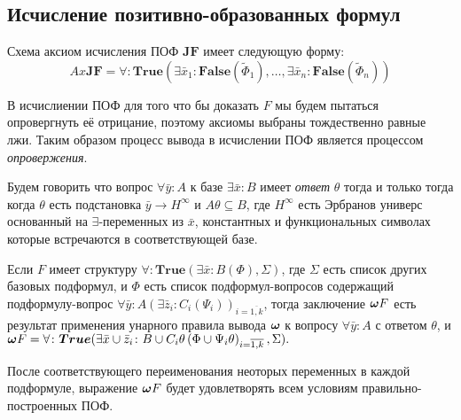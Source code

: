 \subsection{Исчисление позитивно-образованных формул}

Схема аксиом исчисления ПОФ $\boldsymbol{JF}$ имеет следующую форму:
$$ Ax\boldsymbol{JF} = \forall\colon\boldsymbol{True}\left(\exists \bar{x}_1\colon\boldsymbol{False}\left(\widetilde{\Phi}_1\right),\ldots,\exists \bar{x}_n\colon\boldsymbol{False}\left(\widetilde{\Phi}_n\right)\right) $$

В исчислиении ПОФ для того что бы доказать $F$ мы будем пытаться опровергнуть её отрицание, поэтому аксиомы выбраны тождественно равные лжи. Таким образом процесс вывода в исчислении ПОФ является процессом {\em опровержения}.

\begin{definition}
\label{ircond}
Будем говорить что вопрос $\forall \bar{y}\colon A$ к базе $\exists \bar{x}\colon B$ имеет {\em ответ} $\theta$  тогда и только тогда когда $\theta$ есть подстановка $\bar{y} \rightarrow H^{\infty}$ и $A\theta \subseteq B$, где $H^{\infty}$ есть Эрбранов универс основанный на $\exists$-переменных из $\bar{x}$, константных и функциональных символах которые встречаются в соответствующей базе.
\end{definition}


\begin{definition}
Если $F$ имеет структуру $\forall\colon\boldsymbol{True}\left(\exists \bar{x}\colon B\left(\Phi\right),\Sigma\right)$, где $\Sigma$ есть список других базовых подформул, и $\Phi$ есть список подформул-вопросов содержащий подформулу-вопрос $\forall \bar{y}\colon A(\exists \bar{z}_i\colon C_i\left(\Psi_i\right))_{i=\overline{1,k}}$, тогда заключение $\boldsymbol{\omega} F$ есть результат применения унарного правила вывода $\boldsymbol{\omega}$ к вопросу $\forall \bar{y}\colon A$ с ответом $\theta$, и $\boldsymbol{\omega} F = \forall\colon\boldsymbol{True}(\exists \bar{x} \cup \bar{z}_i\colon B \cup C_i\theta\left(\Phi \cup \Psi_i\theta\right)_{i=\overline{1,k}},\Sigma).$

\end{definition}

После соответствующего переименования неоторых переменных в каждой подформуле, выражение $\boldsymbol{\omega} F$ будет удовлетворять всем условиям правильно-построенных ПОФ. 

